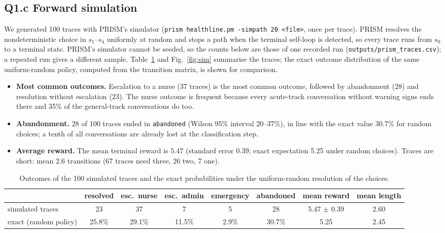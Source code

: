 \documentclass[10pt,a4paper]{article}
\newcommand{\code}[1]{\texttt{#1}}
\begin{document}
\subsection{Q1.c Forward simulation}
We generated 100 traces with PRISM's simulator (\code{prism healthline.pm -simpath 20 <file>}, once per trace). PRISM resolves the nondeterministic choice in $s_1$--$s_4$ uniformly at random and stops a path when the terminal self-loop is detected, so every trace runs from $s_0$ to a terminal state. PRISM's simulator cannot be seeded, so the counts below are those of one recorded run (\code{outputs/prism\_traces.csv}); a repeated run gives a different sample. Table~\ref{tab:sim} and Fig.~\ref{fig:sim} summarise the traces; the exact outcome distribution of the same uniform-random policy, computed from the transition matrix, is shown for comparison.
\begin{itemize}
\item \textbf{Most common outcomes.} Escalation to a nurse (37 traces) is the most common outcome, followed by abandonment (28) and resolution without escalation (23). The nurse outcome is frequent because every acute-track conversation without warning signs ends there and 35\% of the general-track conversations do too.
\item \textbf{Abandonment.} 28 of 100 traces ended in \code{abandoned} (Wilson 95\% interval 20--37\%), in line with the exact value 30.7\% for random choices; a tenth of all conversations are already lost at the classification step.
\item \textbf{Average reward.} The mean terminal reward is $5.47$ (standard error 0.39; exact expectation 5.25 under random choices). Traces are short: mean 2.6 transitions (67 traces need three, 26 two, 7 one).
\end{itemize}

\begin{table}[t]
\centering\small
\caption{Outcomes of the 100 simulated traces and the exact probabilities under the uniform-random resolution of the choices.}
\label{tab:sim}
\begin{tabular}{lccccc|cc}
\toprule
 & resolved & esc.\ nurse & esc.\ admin & emergency & abandoned & mean reward & mean length\\
\midrule
simulated traces & 23 & 37 & 7 & 5 & 28 & 5.47 $\pm$ 0.39 & 2.60\\
exact (random policy) & 25.8\% & 29.1\% & 11.5\% & 2.9\% & 30.7\% & 5.25 & 2.45\\
\bottomrule
\end{tabular}
\end{table}
\end{document}
